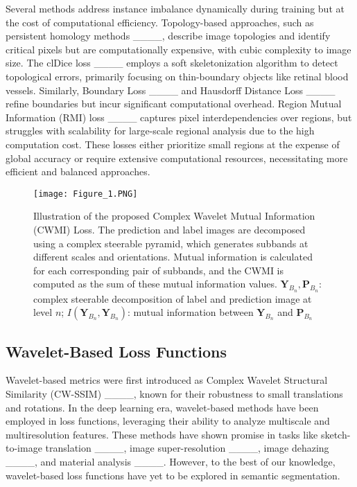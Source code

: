 Several methods address instance imbalance dynamically during training but at the cost of computational efficiency. Topology-based approaches, such as persistent homology methods ____, describe image topologies and identify critical pixels but are computationally expensive, with cubic complexity to image size. The clDice loss ____ employs a soft skeletonization algorithm to detect topological errors, primarily focusing on thin-boundary objects like retinal blood vessels. Similarly, Boundary Loss ____ and Hausdorff Distance Loss ____ refine boundaries but incur significant computational overhead. Region Mutual Information (RMI) loss ____ captures pixel interdependencies over regions, but struggles with scalability for large-scale regional analysis due to the high computation cost. These losses either prioritize small regions at the expense of global accuracy or require extensive computational resources, necessitating more efficient and balanced approaches.


\begin{figure*}
    \centering
    \texttt{[image: Figure\_1.PNG]}
    \vspace{-10pt}
    \caption{Illustration of the proposed Complex Wavelet Mutual Information (CWMI) Loss. The prediction and label images are decomposed using a complex steerable pyramid, which generates subbands at different scales and orientations. Mutual information is calculated for each corresponding pair of subbands, and the CWMI is computed as the sum of these mutual information values. \(\mathbf{Y}_{B_n},\mathbf{P}_{B_n}\): complex steerable decomposition of label and prediction image at level \(n\); \(I(\mathbf{Y}_{B_n}, \mathbf{Y}_{B_n})\): mutual information between \(\mathbf{Y}_{B_n}\) and \(\mathbf{P}_{B_n}\)}
    \label{fig:schematic}
\end{figure*}

\subsection{Wavelet-Based Loss Functions}

Wavelet-based metrics were first introduced as Complex Wavelet Structural Similarity (CW-SSIM) ____, known for their robustness to small translations and rotations. In the deep learning era, wavelet-based methods have been employed in loss functions, leveraging their ability to analyze multiscale and multiresolution features. These methods have shown promise in tasks like sketch-to-image translation ____, image super-resolution ____, image dehazing ____, and material analysis ____. However, to the best of our knowledge, wavelet-based loss functions have yet to be explored in semantic segmentation.


